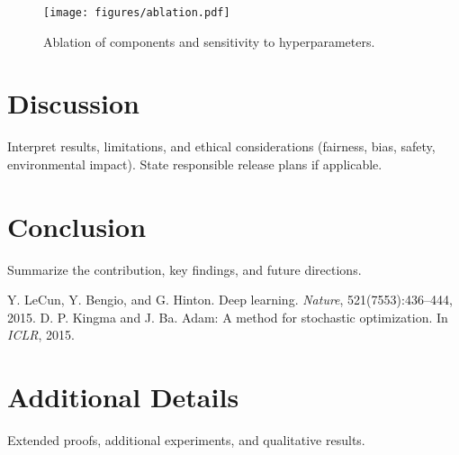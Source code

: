   \begin{figure}[H]
    \centering
    \texttt{[image: figures/ablation.pdf]}
    \caption{Ablation of components and sensitivity to hyperparameters.}
    \label{fig:ablation}
  \end{figure}

  \section{Discussion}
  Interpret results, limitations, and ethical considerations (fairness, bias, safety, environmental impact). State responsible release plans if applicable.

  \section{Conclusion}
  Summarize the contribution, key findings, and future directions.



  \begin{thebibliography}{9}
  Y. LeCun, Y. Bengio, and G. Hinton. Deep learning. \emph{Nature}, 521(7553):436–444, 2015.
  D. P. Kingma and J. Ba. Adam: A method for stochastic optimization. In \emph{ICLR}, 2015.
  \end{thebibliography}

  \appendix
  \section{Additional Details}
  Extended proofs, additional experiments, and qualitative results.

  

  ~
